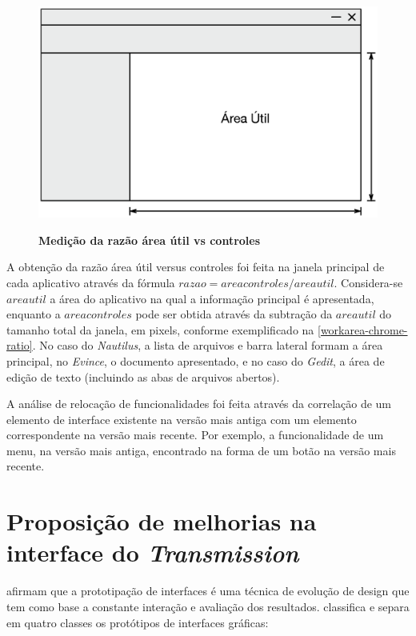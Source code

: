\begin{figure}[!ht]
  \begin{center}
    \caption{\textbf{Medição da razão área útil vs controles}}
    \includegraphics[scale=0.7]{image/workarea-chrome-ratio.eps}
    \label{workarea-chrome-ratio}
  \end{center}
\end{figure}

A obtenção da razão área útil versus controles foi feita na janela principal de
cada aplicativo através da fórmula $razao = areacontroles / areautil$.
Considera-se $areautil$ a área do aplicativo na qual a informação principal é
apresentada, enquanto a $areacontroles$ pode ser obtida através da subtração da
$areautil$ do tamanho total da janela, em pixels, conforme exemplificado na
\autoref {workarea-chrome-ratio}. No caso do \textit{Nautilus}, a lista de
arquivos e barra lateral formam a área principal, no \textit{Evince}, o
documento apresentado, e no caso do \textit{Gedit}, a área de edição de texto
(incluindo as abas de arquivos abertos).

A análise de relocação de funcionalidades foi feita através da correlação de um
elemento de interface existente na versão mais antiga com um elemento
correspondente na versão mais recente. Por exemplo, a funcionalidade de um menu,
na versão mais antiga, encontrado na forma de um botão na versão mais recente.

\section{Proposição de melhorias na interface do \textit{Transmission}}

 afirmam que a prototipação de interfaces é uma técnica
de evolução de design que tem como base a constante interação e avaliação dos
resultados.  classifica e separa em quatro
classes os protótipos de interfaces gráficas:

